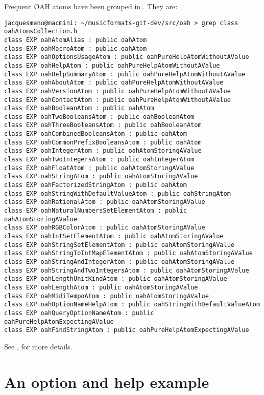 {Frequent OAH atoms have been grouped in . They are:
\begin{lstlisting}[language=Terminal]
jacquesmenu@macmini: ~/musicformats-git-dev/src/oah > grep class oahAtomsCollection.h
class EXP oahAtomAlias : public oahAtom
class EXP oahMacroAtom : public oahAtom
class EXP oahOptionsUsageAtom : public oahPureHelpAtomWithoutAValue
class EXP oahHelpAtom : public oahPureHelpAtomWithoutAValue
class EXP oahHelpSummaryAtom : public oahPureHelpAtomWithoutAValue
class EXP oahAboutAtom : public oahPureHelpAtomWithoutAValue
class EXP oahVersionAtom : public oahPureHelpAtomWithoutAValue
class EXP oahContactAtom : public oahPureHelpAtomWithoutAValue
class EXP oahBooleanAtom : public oahAtom
class EXP oahTwoBooleansAtom : public oahBooleanAtom
class EXP oahThreeBooleansAtom : public oahBooleanAtom
class EXP oahCombinedBooleansAtom : public oahAtom
class EXP oahCommonPrefixBooleansAtom : public oahAtom
class EXP oahIntegerAtom : public oahAtomStoringAValue
class EXP oahTwoIntegersAtom : public oahIntegerAtom
class EXP oahFloatAtom : public oahAtomStoringAValue
class EXP oahStringAtom : public oahAtomStoringAValue
class EXP oahFactorizedStringAtom : public oahAtom
class EXP oahStringWithDefaultValueAtom : public oahStringAtom
class EXP oahRationalAtom : public oahAtomStoringAValue
class EXP oahNaturalNumbersSetElementAtom : public oahAtomStoringAValue
class EXP oahRGBColorAtom : public oahAtomStoringAValue
class EXP oahIntSetElementAtom : public oahAtomStoringAValue
class EXP oahStringSetElementAtom : public oahAtomStoringAValue
class EXP oahStringToIntMapElementAtom : public oahAtomStoringAValue
class EXP oahStringAndIntegerAtom : public oahAtomStoringAValue
class EXP oahStringAndTwoIntegersAtom : public oahAtomStoringAValue
class EXP oahLengthUnitKindAtom : public oahAtomStoringAValue
class EXP oahLengthAtom : public oahAtomStoringAValue
class EXP oahMidiTempoAtom : public oahAtomStoringAValue
class EXP oahOptionNameHelpAtom : public oahStringWithDefaultValueAtom
class EXP oahQueryOptionNameAtom : public oahPureHelpAtomExpectingAValue
class EXP oahFindStringAtom : public oahPureHelpAtomExpectingAValue
\end{lstlisting}

See , for more details.


\section{An option and help example}

}

